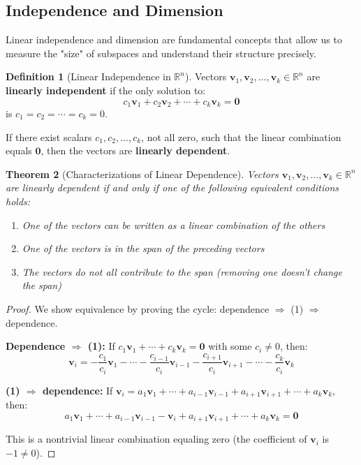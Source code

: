 \documentclass[12pt]{article}
\numberwithin{equation}{section}
\newcommand{\vect}[1]{\boldsymbol{#1}}   %
\theoremstyle{plain}
\newtheorem{theorem}{Theorem}[section]
\theoremstyle{definition}
\newtheorem{definition}[theorem]{Definition}
\theoremstyle{remark}
\begin{document}
\subsection{Independence and Dimension}

Linear independence and dimension are fundamental concepts that allow us to measure the "size" of subspaces and understand their structure precisely.

\begin{definition}[Linear Independence in $\mathbb{R}^n$]
Vectors $\vect{v}_1, \vect{v}_2, \ldots, \vect{v}_k \in \mathbb{R}^n$ are \textbf{linearly independent} if the only solution to:
$$c_1\vect{v}_1 + c_2\vect{v}_2 + \cdots + c_k\vect{v}_k = \vect{0}$$
is $c_1 = c_2 = \cdots = c_k = 0$.

If there exist scalars $c_1, c_2, \ldots, c_k$, not all zero, such that the linear combination equals $\vect{0}$, then the vectors are \textbf{linearly dependent}.
\end{definition}

\begin{theorem}[Characterizations of Linear Dependence]
Vectors $\vect{v}_1, \vect{v}_2, \ldots, \vect{v}_k \in \mathbb{R}^n$ are linearly dependent if and only if one of the following equivalent conditions holds:
\begin{enumerate}
\item One of the vectors can be written as a linear combination of the others
\item One of the vectors is in the span of the preceding vectors
\item The vectors do not all contribute to the span (removing one doesn't change the span)
\end{enumerate}
\end{theorem}

\begin{proof}
We show equivalence by proving the cycle: dependence $\Rightarrow$ (1) $\Rightarrow$ dependence.

\textbf{Dependence $\Rightarrow$ (1):} If $c_1\vect{v}_1 + \cdots + c_k\vect{v}_k = \vect{0}$ with some $c_i \neq 0$, then:
$$\vect{v}_i = -\frac{c_1}{c_i}\vect{v}_1 - \cdots - \frac{c_{i-1}}{c_i}\vect{v}_{i-1} - \frac{c_{i+1}}{c_i}\vect{v}_{i+1} - \cdots - \frac{c_k}{c_i}\vect{v}_k$$

\textbf{(1) $\Rightarrow$ dependence:} If $\vect{v}_i = a_1\vect{v}_1 + \cdots + a_{i-1}\vect{v}_{i-1} + a_{i+1}\vect{v}_{i+1} + \cdots + a_k\vect{v}_k$, then:
$$a_1\vect{v}_1 + \cdots + a_{i-1}\vect{v}_{i-1} - \vect{v}_i + a_{i+1}\vect{v}_{i+1} + \cdots + a_k\vect{v}_k = \vect{0}$$

This is a nontrivial linear combination equaling zero (the coefficient of $\vect{v}_i$ is $-1 \neq 0$).
\end{proof}
\end{document}
